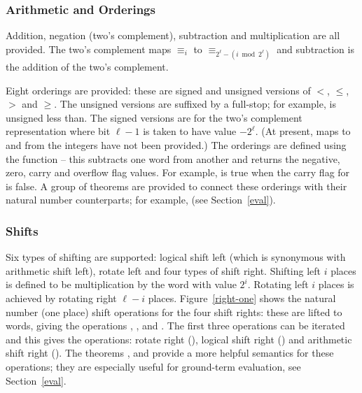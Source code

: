 \subsubsection{Arithmetic and Orderings}

Addition, negation (two's complement), subtraction and multiplication are all provided.  The two's complement maps ${\equiv_i}$ to ${\equiv_{2^\ell - (i \bmod 2^\ell)}}$ and subtraction is the addition of the two's complement.

Eight orderings are provided: these are signed and unsigned versions of $<$, $\leq$, $>$ and $\geq$.  The unsigned versions are suffixed by a full-stop; for example,  is unsigned less than.  The signed versions are for the two's complement representation \ie{} where bit $\ell - 1$ is taken to have value $-2^\ell$.  (At present, maps to and from the integers have not been provided.)  The orderings are defined using the function  -- this subtracts one word from another and returns the negative, zero, carry and overflow flag values.  For example,  is true when the carry flag for  is false.  A group of theorems are provided to connect these orderings with their natural number counterparts; for example,  (see Section~\ref{eval}).

\subsubsection{Shifts}

Six types of shifting are supported: logical shift left (which is synonymous with arithmetic shift left), rotate left and four types of shift right.
Shifting left $i$ places is defined to be multiplication by the word with value $2^i$.
Rotating left $i$ places is achieved by rotating right $\ell - i$ places.
Figure~\ref{right-one} shows the natural number (one place) shift operations for the four shift rights: these are lifted to words, giving the operations , ,  and .
The first three operations can be iterated and this gives the operations: rotate right (\ml{\#>>}), logical shift right (\ml{>>>}) and arithmetic shift right (\ml{>>}).  The theorems ,  and  provide a more helpful semantics for these operations; they are especially useful for ground-term evaluation, see Section~\ref{eval}.

